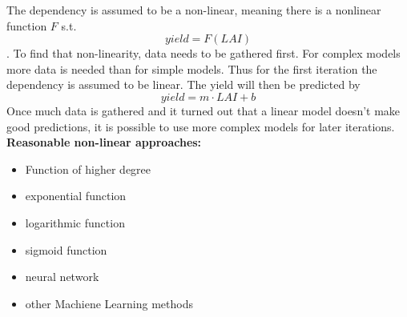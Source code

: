 The dependency is assumed to be a non-linear, meaning there is a nonlinear function $F$ s.t. $$yield = F(LAI)$$. To find that non-linearity, data needs to be gathered first. For complex models more data is needed than for simple models. Thus for the first iteration the dependency is assumed to be linear. The yield will then be predicted by
$$yield = m\cdot LAI + b$$
Once much data is gathered and it turned out that a linear model doesn't make good
predictions, it is possible to use more complex models for later iterations.\\

\textbf{Reasonable non-linear approaches:}

\begin{itemize}
   \item Function of higher degree
   \item exponential function
   \item logarithmic function
   \item sigmoid function
   \item neural network
   \item other Machiene Learning methods
\end{itemize}
